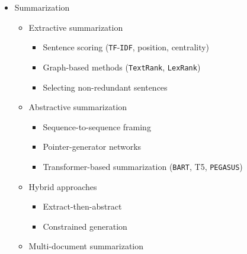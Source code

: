 \documentclass[
]{article}
\providecommand{\tightlist}{%
  \setlength{\itemsep}{0pt}\setlength{\parskip}{0pt}}
\begin{document}
\begin{itemize}
\begin{itemize}
    \begin{itemize}
    \tightlist
    \item
      \texttt{BLEU} and its variants
    \item
      \texttt{chrF}, METEOR, \texttt{TER}
    \item
      \texttt{BERTScore} and learned metrics
    \item
      Human evaluation: adequacy and fluency
    \end{itemize}
  \item
    Practical considerations

    \begin{itemize}
    \tightlist
    \item
      Domain adaptation
    \item
      Terminology and glossaries
    \item
      Low-resource translation
    \end{itemize}
  \end{itemize}
\item
  Summarization

  \begin{itemize}
  \tightlist
  \item
    Extractive summarization

    \begin{itemize}
    \tightlist
    \item
      Sentence scoring (\texttt{TF}-\texttt{IDF}, position, centrality)
    \item
      Graph-based methods (\texttt{TextRank}, \texttt{LexRank})
    \item
      Selecting non-redundant sentences
    \end{itemize}
  \item
    Abstractive summarization

    \begin{itemize}
    \tightlist
    \item
      Sequence-to-sequence framing
    \item
      Pointer-generator networks
    \item
      Transformer-based summarization (\texttt{BART}, T5,
      \texttt{PEGASUS})
    \end{itemize}
  \item
    Hybrid approaches

    \begin{itemize}
    \tightlist
    \item
      Extract-then-abstract
    \item
      Constrained generation
    \end{itemize}
  \item
    Multi-document summarization


\end{itemize}
\end{itemize}
\end{document}

